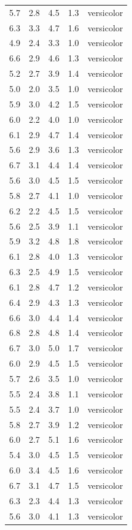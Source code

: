 \documentclass[
  letterpaper,
  DIV=11,
  numbers=noendperiod]{scrreprt}
\begin{document}
\begin{longtable}[]{@{}rrrrl@{}}
5.7 & 2.8 & 4.5 & 1.3 & versicolor \\
6.3 & 3.3 & 4.7 & 1.6 & versicolor \\
4.9 & 2.4 & 3.3 & 1.0 & versicolor \\
6.6 & 2.9 & 4.6 & 1.3 & versicolor \\
5.2 & 2.7 & 3.9 & 1.4 & versicolor \\
5.0 & 2.0 & 3.5 & 1.0 & versicolor \\
5.9 & 3.0 & 4.2 & 1.5 & versicolor \\
6.0 & 2.2 & 4.0 & 1.0 & versicolor \\
6.1 & 2.9 & 4.7 & 1.4 & versicolor \\
5.6 & 2.9 & 3.6 & 1.3 & versicolor \\
6.7 & 3.1 & 4.4 & 1.4 & versicolor \\
5.6 & 3.0 & 4.5 & 1.5 & versicolor \\
5.8 & 2.7 & 4.1 & 1.0 & versicolor \\
6.2 & 2.2 & 4.5 & 1.5 & versicolor \\
5.6 & 2.5 & 3.9 & 1.1 & versicolor \\
5.9 & 3.2 & 4.8 & 1.8 & versicolor \\
6.1 & 2.8 & 4.0 & 1.3 & versicolor \\
6.3 & 2.5 & 4.9 & 1.5 & versicolor \\
6.1 & 2.8 & 4.7 & 1.2 & versicolor \\
6.4 & 2.9 & 4.3 & 1.3 & versicolor \\
6.6 & 3.0 & 4.4 & 1.4 & versicolor \\
6.8 & 2.8 & 4.8 & 1.4 & versicolor \\
6.7 & 3.0 & 5.0 & 1.7 & versicolor \\
6.0 & 2.9 & 4.5 & 1.5 & versicolor \\
5.7 & 2.6 & 3.5 & 1.0 & versicolor \\
5.5 & 2.4 & 3.8 & 1.1 & versicolor \\
5.5 & 2.4 & 3.7 & 1.0 & versicolor \\
5.8 & 2.7 & 3.9 & 1.2 & versicolor \\
6.0 & 2.7 & 5.1 & 1.6 & versicolor \\
5.4 & 3.0 & 4.5 & 1.5 & versicolor \\
6.0 & 3.4 & 4.5 & 1.6 & versicolor \\
6.7 & 3.1 & 4.7 & 1.5 & versicolor \\
6.3 & 2.3 & 4.4 & 1.3 & versicolor \\
5.6 & 3.0 & 4.1 & 1.3 & versicolor \\

\end{longtable}
\end{document}
